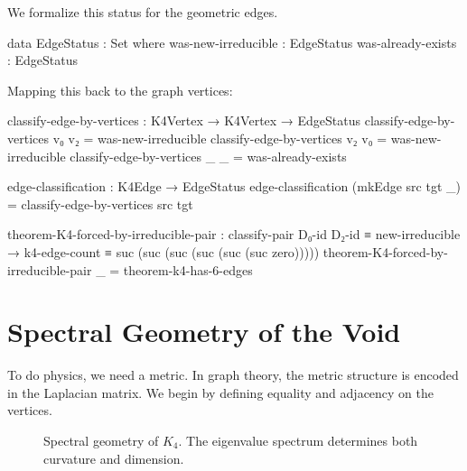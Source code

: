 \documentclass[11pt,a4paper]{book}
\begin{document}
We formalize this status for the geometric edges.

\begin{code}
data EdgeStatus : Set where
  was-new-irreducible : EdgeStatus
  was-already-exists  : EdgeStatus

\end{code}

Mapping this back to the graph vertices:

\begin{code}
classify-edge-by-vertices : K4Vertex → K4Vertex → EdgeStatus
classify-edge-by-vertices v₀ v₂ = was-new-irreducible
classify-edge-by-vertices v₂ v₀ = was-new-irreducible
classify-edge-by-vertices _ _ = was-already-exists

edge-classification : K4Edge → EdgeStatus
edge-classification (mkEdge src tgt _) = classify-edge-by-vertices src tgt

\end{code}

\begin{code}
theorem-K4-forced-by-irreducible-pair : 
  classify-pair D₀-id D₂-id ≡ new-irreducible →
  k4-edge-count ≡ suc (suc (suc (suc (suc (suc zero)))))
theorem-K4-forced-by-irreducible-pair _ = theorem-k4-has-6-edges
\end{code}

\section{Spectral Geometry of the Void}

To do physics, we need a metric. In graph theory, the metric structure is encoded in the Laplacian matrix. We begin by defining equality and adjacency on the vertices.

\begin{figure}[h]
\centering
{}
\caption{Spectral geometry of $K_4$. The eigenvalue spectrum determines both curvature and dimension.}
\label{fig:spectral-geometry}
\end{figure}
\end{document}
